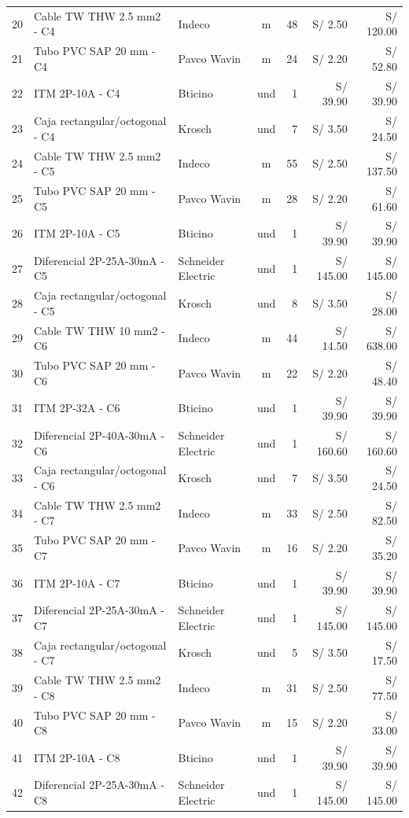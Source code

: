 \documentclass[11pt,a4paper]{article}
\begin{document}
\begin{table}[H]
\begin{small}
\begin{tabularx}{\textwidth}{l X l c r r r}
20 & Cable TW THW 2.5 mm2 - C4 & Indeco & m & 48 & S/ 2.50 & S/ 120.00 \\
21 & Tubo PVC SAP 20 mm - C4 & Pavco Wavin & m & 24 & S/ 2.20 & S/ 52.80 \\
22 & ITM 2P-10A - C4 & Bticino & und & 1 & S/ 39.90 & S/ 39.90 \\
23 & Caja rectangular/octogonal - C4 & Krosch & und & 7 & S/ 3.50 & S/ 24.50 \\
24 & Cable TW THW 2.5 mm2 - C5 & Indeco & m & 55 & S/ 2.50 & S/ 137.50 \\
25 & Tubo PVC SAP 20 mm - C5 & Pavco Wavin & m & 28 & S/ 2.20 & S/ 61.60 \\
26 & ITM 2P-10A - C5 & Bticino & und & 1 & S/ 39.90 & S/ 39.90 \\
27 & Diferencial 2P-25A-30mA - C5 & Schneider Electric & und & 1 & S/ 145.00 & S/ 145.00 \\
28 & Caja rectangular/octogonal - C5 & Krosch & und & 8 & S/ 3.50 & S/ 28.00 \\
29 & Cable TW THW 10 mm2 - C6 & Indeco & m & 44 & S/ 14.50 & S/ 638.00 \\
30 & Tubo PVC SAP 20 mm - C6 & Pavco Wavin & m & 22 & S/ 2.20 & S/ 48.40 \\
31 & ITM 2P-32A - C6 & Bticino & und & 1 & S/ 39.90 & S/ 39.90 \\
32 & Diferencial 2P-40A-30mA - C6 & Schneider Electric & und & 1 & S/ 160.60 & S/ 160.60 \\
33 & Caja rectangular/octogonal - C6 & Krosch & und & 7 & S/ 3.50 & S/ 24.50 \\
34 & Cable TW THW 2.5 mm2 - C7 & Indeco & m & 33 & S/ 2.50 & S/ 82.50 \\
35 & Tubo PVC SAP 20 mm - C7 & Pavco Wavin & m & 16 & S/ 2.20 & S/ 35.20 \\
36 & ITM 2P-10A - C7 & Bticino & und & 1 & S/ 39.90 & S/ 39.90 \\
37 & Diferencial 2P-25A-30mA - C7 & Schneider Electric & und & 1 & S/ 145.00 & S/ 145.00 \\
38 & Caja rectangular/octogonal - C7 & Krosch & und & 5 & S/ 3.50 & S/ 17.50 \\
39 & Cable TW THW 2.5 mm2 - C8 & Indeco & m & 31 & S/ 2.50 & S/ 77.50 \\
40 & Tubo PVC SAP 20 mm - C8 & Pavco Wavin & m & 15 & S/ 2.20 & S/ 33.00 \\
41 & ITM 2P-10A - C8 & Bticino & und & 1 & S/ 39.90 & S/ 39.90 \\
42 & Diferencial 2P-25A-30mA - C8 & Schneider Electric & und & 1 & S/ 145.00 & S/ 145.00 \\

\end{tabularx}
\end{small}
\end{table}
\end{document}
